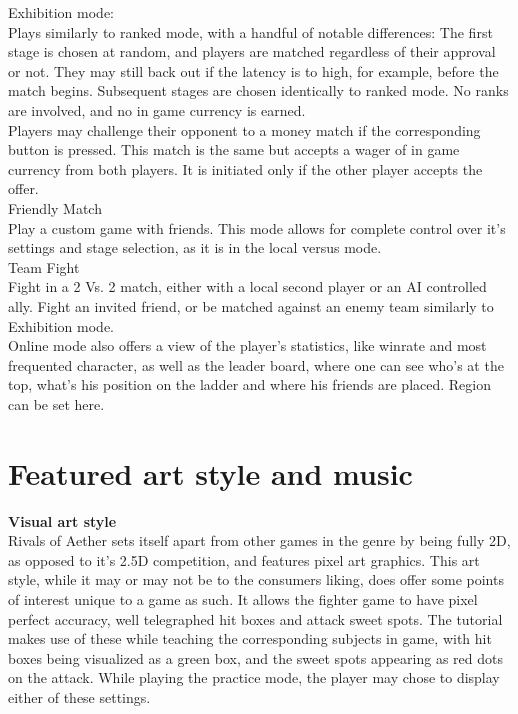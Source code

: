 \documentclass{article}
\begin{document}
Exhibition mode:\\
Plays similarly to ranked mode, with a handful of notable differences: The first stage is chosen at random, and players are matched regardless of their approval or not. They may still back out if the latency is to high, for example, before the match begins. Subsequent stages are chosen identically to ranked mode. No ranks are involved, and no in game currency is earned.\\
Players may challenge their opponent to a money match if the corresponding button is pressed. This match is the same but accepts a wager of in game currency from both players. It is initiated only if the other player accepts the offer.\\

Friendly Match\\
Play a custom game with friends. This mode allows for complete control over it's settings and stage selection, as it is in the local versus mode.
\\
Team Fight\\
Fight in a 2 Vs. 2 match, either with a local second player or an AI controlled ally. Fight an invited friend, or be matched against an enemy team similarly to Exhibition mode.
\\

Online mode also offers a view of the player's statistics, like winrate and most frequented character, as well as the leader board, where one can see who's at the top, what's his position on the ladder and where his friends are placed. Region can be set here.\\


\chapter{Featured art style and music}

\textbf{Visual art style}\\
Rivals of Aether sets itself apart from other games in the genre by being fully 2D, as opposed to it's 2.5D competition, and features pixel art graphics. This art style, while it may or may not be to the consumers liking, does offer some points of interest unique to a game as such. It allows the fighter game to have pixel perfect accuracy, well telegraphed hit boxes and attack sweet spots. The tutorial makes use of these while teaching the corresponding subjects in game, with hit boxes being visualized as a green box, and the sweet spots appearing as red dots on the attack.
While playing the practice mode, the player may chose to display either of these settings.\\
\end{document}
